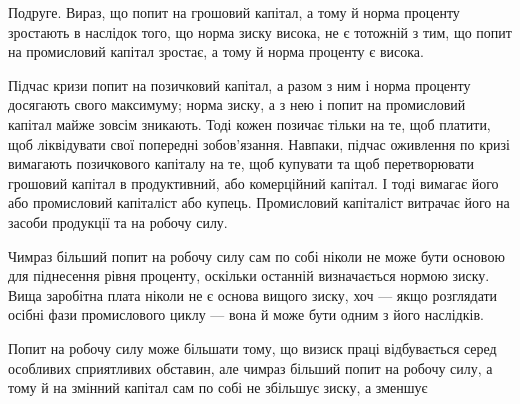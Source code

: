 Подруге. Вираз, що попит на грошовий капітал, а тому й норма проценту
зростають в наслідок того, що норма зиску висока, не є тотожній з тим, що попит
на промисловий капітал зростає, а тому й норма проценту є висока.

Підчас кризи попит на позичковий капітал, а разом з ним і норма проценту
досягають свого максимуму; норма зиску, а з нею і попит на промисловий
капітал майже зовсім зникають. Тоді кожен позичає тільки на те, щоб
платити, щоб ліквідувати свої попередні зобов’язання. Навпаки, підчас оживлення
по кризі вимагають позичкового капіталу на те, щоб купувати та щоб перетворювати
грошовий капітал в продуктивний, або комерційний капітал. І тоді
вимагає його або промисловий капіталіст або купець. Промисловий капіталіст
витрачає його на засоби продукції та на робочу силу.

Чимраз більший попит на робочу силу сам по собі ніколи не може бути
основою для піднесення рівня проценту, оскільки останній визначається нормою
зиску. Вища заробітна плата ніколи не є основа вищого зиску, хоч — якщо
розглядати осібні фази промислового циклу — вона й може бути одним з його
наслідків.

Попит на робочу силу може більшати тому, що визиск праці відбувається
серед особливих сприятливих обставин, але чимраз більший попит на робочу
силу, а тому й на змінний капітал сам по собі не збільшує зиску, а зменшує
\parbreak{}  %
